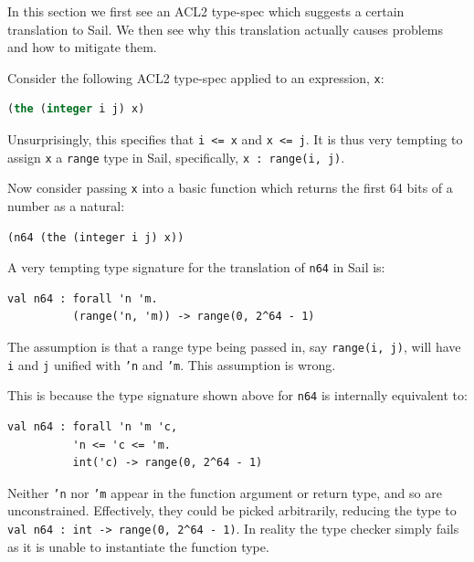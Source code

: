 \documentclass[a4paper,12pt,twoside,openright]{report}
\begin{document}
In this section we first see an ACL2 type-spec which suggests a certain translation to Sail.  We then see why this translation actually causes problems and how to mitigate them.

Consider the following ACL2 type-spec applied to an expression, \texttt{x}:

\begin{lstlisting}[language=lisp]
(the (integer i j) x)
\end{lstlisting}

Unsurprisingly, this specifies that \texttt{i <= x} and \texttt{x <= j}.  It is thus very tempting to assign \texttt{x} a \texttt{range} type in Sail, specifically, \texttt{x : range(i, j)}.

Now consider passing \texttt{x} into a basic function which returns the first 64 bits of a number as a natural:

\begin{lstlisting}[language=sail]
(n64 (the (integer i j) x))
\end{lstlisting}

A very tempting type signature for the translation of \texttt{n64} in Sail is:

\begin{minipage}{\linewidth}
\begin{lstlisting}[language=sail]
val n64 : forall 'n 'm.
          (range('n, 'm)) -> range(0, 2^64 - 1)
\end{lstlisting}
\end{minipage}

The assumption is that a range type being passed in, say \texttt{range(i, j)}, will have \texttt{i} and \texttt{j} unified with \texttt{'n} and \texttt{'m}.  This assumption is wrong.

This is because the type signature shown above for \texttt{n64} is internally equivalent to:

\begin{minipage}{\linewidth}
\begin{lstlisting}[language=sail]
val n64 : forall 'n 'm 'c,
          'n <= 'c <= 'm.
          int('c) -> range(0, 2^64 - 1)
\end{lstlisting}
\end{minipage}

Neither \texttt{'n} nor \texttt{'m} appear in the function argument or return type, and so are unconstrained.  Effectively, they could be picked arbitrarily, reducing the type to \texttt{val n64 : int -> range(0, 2\^{}64 - 1)}.  In reality the type checker simply fails as it is unable to instantiate the function type.
\end{document}
